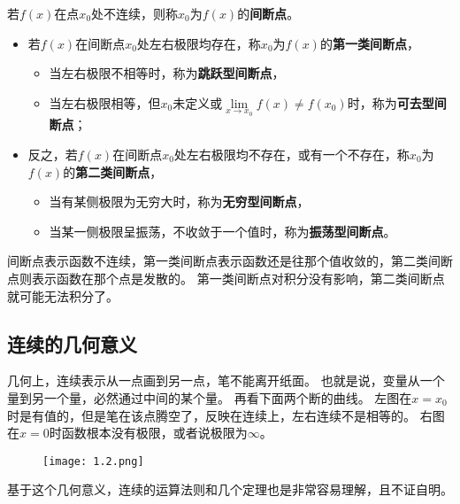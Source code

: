 \begin{definition}[间断点]
若$f\left( x \right) $在点$x_0$处不连续，则称$x_0$为$f\left( x \right) $的{\bf 间断点}。
\begin{itemize}
    \item 若$f\left( x \right) $在间断点$x_0$处左右极限均存在，称$x_0$为$f\left( x \right) $的{\bf 第一类间断点}，
    \begin{itemize}
        \item 当左右极限不相等时，称为{\bf 跳跃型间断点}，
        \item 当左右极限相等，但$x_0$未定义或$\underset{x\rightarrow x_0}{\lim}f\left( x \right) \ne f\left( x_0 \right) $时，称为{\bf 可去型间断点}；
    \end{itemize}
    \item 反之，若$f\left( x \right) $在间断点$x_0$处左右极限均不存在，或有一个不存在，称$x_0$为$f\left( x \right) $的{\bf 第二类间断点}，
    \begin{itemize}
        \item 当有某侧极限为无穷大时，称为{\bf 无穷型间断点}，
        \item 当某一侧极限呈振荡，不收敛于一个值时，称为{\bf 振荡型间断点}。
    \end{itemize}
\end{itemize}
\end{definition}

间断点表示函数不连续，第一类间断点表示函数还是往那个值收敛的，第二类间断点则表示函数在那个点是发散的。
第一类间断点对积分没有影响，第二类间断点就可能无法积分了。

\subsection{连续的几何意义}

几何上，连续表示从一点画到另一点，笔不能离开纸面。
也就是说，变量从一个量到另一个量，必然通过中间的某个量。
再看下面两个断的曲线。
左图在$x=x_0$时是有值的，但是笔在该点腾空了，反映在连续上，左右连续不是相等的。
右图在$x=0$时函数根本没有极限，或者说极限为$\infty $。

\begin{figure}[h]
\centering
\texttt{[image: 1.2.png]}
\end{figure}

基于这个几何意义，连续的运算法则和几个定理也是非常容易理解，且不证自明。

